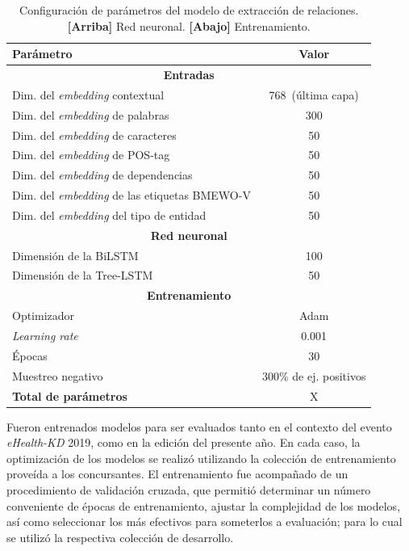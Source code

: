 \begin{table}[tb]\centering
	\begin{tabular}{lc}
		\hline
		\textbf{Parámetro} & \textbf{Valor} \\
		\hline
		\hline
		\multicolumn{2}{c}{\textbf{Entradas}}\\
		\hline
		\hline
		Dim. del \textit{embedding} contextual & 768~(última capa)\\
		Dim. del \textit{embedding} de palabras & 300\\
		Dim. del \textit{embedding} de caracteres & 50\\
		Dim. del \textit{embedding} de POS-tag & 50\\
		Dim. del \textit{embedding} de dependencias & 50\\
		Dim. del \textit{embedding} de las etiquetas BMEWO-V & 50\\
		Dim. del \textit{embedding} del tipo de entidad & 50\\
		
		\hline
		\hline
		\multicolumn{2}{c}{\textbf{Red neuronal}}\\
		\hline
		\hline
		
		Dimensión de la BiLSTM & 100\\
		Dimensión de la Tree-LSTM & 50\\
		
		\hline
		\hline
		\multicolumn{2}{c}{\textbf{Entrenamiento}}\\
		\hline
		\hline
		
		Optimizador & Adam\\
		\textit{Learning rate} & 0.001\\
		Épocas & 30\\
		Muestreo negativo & 300\% de ej. positivos\\
		
		\hline
		\hline
		
		\textbf{Total de parámetros} & X\\
		
		\hline
		
	\end{tabular}
	
	\caption{Configuración de parámetros del modelo de extracción de relaciones. \textbf{[Arriba]} Red neuronal. \textbf{[Abajo]} Entrenamiento.}\label{table:params_taskB}
	
\end{table}
		
Fueron entrenados modelos para ser evaluados tanto en el contexto del evento \textit{eHealth-KD} 2019, como en la edición del presente año.
En cada caso, la optimización de los modelos se realizó utilizando la colección de entrenamiento proveída a los concursantes.
El entrenamiento fue acompañado de un procedimiento de validación cruzada, que permitió determinar un número conveniente de épocas de entrenamiento, ajustar la complejidad de los modelos, así como seleccionar los más efectivos para someterlos a evaluación; para lo cual se utilizó la respectiva colección de desarrollo.


